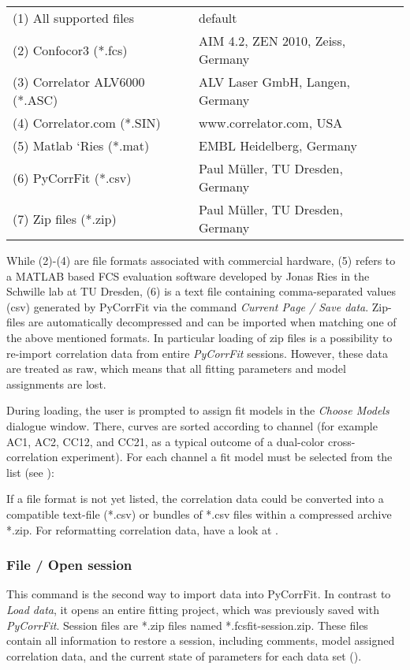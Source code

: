 \begin{tabular}{l l}
 \rule{0pt}{3ex}  (1) All supported files & default \\
 \rule{0pt}{3ex} (2) Confocor3 (*.fcs) & AIM 4.2, ZEN 2010, Zeiss, Germany \\
 \rule{0pt}{3ex} (3) Correlator ALV6000 (*.ASC) & ALV Laser GmbH, Langen, Germany \\
 \rule{0pt}{3ex} (4) Correlator.com (*.SIN) & www.correlator.com, USA \\
 \rule{0pt}{3ex} (5) Matlab ‘Ries (*.mat) & EMBL Heidelberg, Germany \\
 \rule{0pt}{3ex} (6) PyCorrFit (*.csv) & Paul Müller, TU Dresden, Germany \\
 \rule{0pt}{3ex} (7) Zip files (*.zip) & Paul Müller, TU Dresden, Germany \\
\end{tabular}
\vspace{3ex}
\newline
While (2)-(4) are file formats associated with commercial hardware, (5) refers to a MATLAB based FCS evaluation software developed by Jonas Ries in the Schwille lab at TU Dresden, (6) is a text file containing comma-separated values (csv) generated by PyCorrFit via the command \textit{Current Page / Save data}. Zip-files are automatically decompressed and can be imported when matching one of the above mentioned formats. In particular loading of zip files is a possibility to re-import correlation data from entire \textit{PyCorrFit} sessions. However, these data are treated as raw, which means that all fitting parameters and model assignments are lost.

During loading, the user is prompted to assign fit models in the \textit{Choose Models} dialogue window. There, curves are sorted according to channel (for example AC1, AC2, CC12, and CC21, as a typical outcome of a dual-color cross-correlation experiment). For each channel a fit model must be selected from the list (see ):

If a file format is not yet listed, the correlation data could be converted into a compatible text-file (*.csv) or bundles of *.csv files within a compressed archive *.zip. For reformatting correlation data, have a look at .

\subsubsection{File / Open session}
\label{sec:menub.filem.opens}
This command is the second way to import data into PyCorrFit. In contrast to \textit{Load data}, it opens an entire fitting project, which was previously saved with \textit{PyCorrFit}. Session files are *.zip files named *.fcsfit-session.zip. These files contain all information to restore a session, including comments, model assigned correlation data, and the current state of parameters for each data set ().

